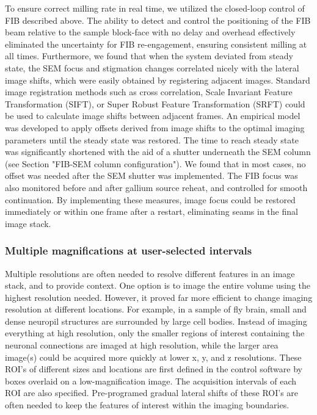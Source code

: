 \documentclass{article}
\begin{document}
To ensure correct milling rate in real time, we utilized the closed-loop control of FIB described above. The ability to detect and control the positioning of the FIB beam relative to the sample block-face with no delay and overhead effectively eliminated the uncertainty for FIB re-engagement, ensuring consistent milling at all times. Furthermore, we found that when the system deviated from steady state, the SEM focus and stigmation changes correlated nicely with the lateral image shifts, which were easily obtained by registering adjacent images. Standard image registration methods such as cross correlation, Scale Invariant Feature Transformation (SIFT), or Super Robust Feature Transformation (SRFT) could be used to calculate image shifts between adjacent frames. An empirical model was developed to apply offsets derived from image shifts to the optimal imaging parameters until the steady state was restored. The time to reach steady state was significantly shortened with the aid of a shutter underneath the SEM column (see Section "FIB-SEM column configuration"). We found that in most cases, no offset was needed after the SEM shutter was implemented. The FIB focus was also monitored before and after gallium source reheat, and controlled for smooth continuation. By implementing these measures, image focus could be restored immediately or within one frame after a restart, eliminating seams in the final image stack.

\subsubsection*{Multiple magnifications at user-selected intervals}

Multiple resolutions are often needed to resolve different features in an image stack, and to provide context. One option is to image the entire volume using the highest resolution needed. However, it proved far more efficient to change imaging resolution at different locations. For example, in a sample of fly brain, small and dense neuropil structures are surrounded by large cell bodies. Instead of imaging everything at high resolution, only the smaller regions of interest containing the neuronal connections are imaged at high resolution, while the larger area image(s) could be acquired more quickly at lower x, y, and z resolutions. These ROI’s of different sizes and locations are first defined in the control software by boxes overlaid on a low-magnification image. The acquisition intervals of each ROI are also specified. Pre-programed gradual lateral shifts of these ROI’s are often needed to keep the features of interest within the imaging boundaries.
\end{document}
